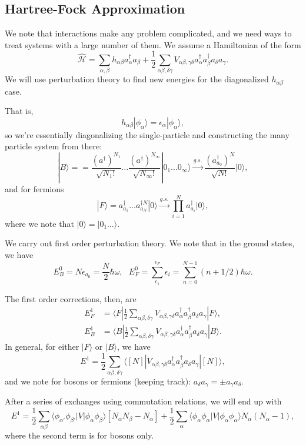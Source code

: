 \documentclass[fontsize=12pt]{scrartcl}
\newcommand{\la}{\langle}
\newcommand{\ra}{\rangle}
\newcommand{\Ham}{\hat{\mathcal{H}}}
\begin{document}
\subsection{Hartree-Fock Approximation}

We note that interactions make any problem complicated, and we need ways to treat systems with a large number of them. We assume a Hamiltonian of the form $$\Ham = \sum_{\alpha,\beta}h_{\alpha\beta}a^\dagger_\alpha a_\beta + \frac{1}{2}\sum_{\alpha\beta, \delta\gamma} V_{\alpha\beta,\gamma\delta} a_\alpha^\dagger a_\beta^\dagger a_\delta a_\gamma.$$ We will use perturbation theory to find new energies for the diagonalized $h_{\alpha\beta}$ case.

That is, $$h_{\alpha\beta}|\phi_\alpha\ra = \epsilon_\alpha|\phi_\alpha\ra,$$ so we're essentially diagonalizing the single-particle and constructing the many particle system from there: $$ |B\ra = = \frac{(a^\dagger)^{N_1}}{\sqrt{N_1!}}\dots \frac{(a^\dagger)^{N_\infty}}{\sqrt{N_\infty!}}|0_1\dots 0_\infty\ra\overset{g.s.}{\to} \frac{(a_{a_0}^\dagger)^N}{\sqrt{N!}}|0\ra,$$ and for fermions $$|F\ra =  a_{a_1}^\dagger\dots a^{\dagger N}_{a_N} |0\ra \overset{g.s.}{\to}\prod_{i=1}^N a^\dagger_{a_i}|0\ra,$$ where we note that $|0\ra = |0_1\dots\ra$.

We carry out first order perturbation theory. We note that in the ground states, we have $$E_B^0 = N\epsilon_{a_0}= \frac{N}{2}\hbar\omega, \ \ \ E_F^0 = \sum_{\epsilon_1}^{\epsilon_F} \epsilon_i = \sum_{n=0}^{N-1}(n+1/2)\hbar\omega.$$

The first order corrections, then, are \begin{align*}
E_F^1 &= \la F|\frac{1}{2}\sum_{\alpha\beta, \delta\gamma} V_{\alpha\beta,\gamma\delta} a_\alpha^\dagger a_\beta^\dagger a_\delta a_\gamma |F\ra,\\
E_B^1 &= \la B |\frac{1}{2}\sum_{\alpha\beta, \delta\gamma} V_{\alpha\beta,\gamma\delta} a_\alpha^\dagger a_\beta^\dagger a_\delta a_\gamma | B \ra.
\end{align*} In general, for either $|F\ra$ or $|B\ra$, we have $$E^1 =  \frac{1}{2}\sum_{\alpha\beta, \delta\gamma}\la [N] | V_{\alpha\beta,\gamma\delta} a_\alpha^\dagger a_\beta^\dagger a_\delta a_\gamma | [N]\ra,$$ and we note for bosons or fermions (keeping track): $a_\delta a_\gamma = \pm a_\gamma a_\delta.$

After a series of exchanges using commutation relations, we will end up with $$E^1 = \frac{1}{2}\sum_{\alpha\beta} \la \phi_{\alpha'}\phi_{\beta'}|V|\phi_\alpha\phi_\beta\ra [N_\alpha N_\beta - N_\alpha] + \frac{1}{2} \sum_{\alpha} \la \phi_\alpha\phi_\alpha|V|\phi_\alpha\phi_\alpha\ra N_\alpha(N_\alpha-1),$$ where the second term is for bosons only.
\end{document}
